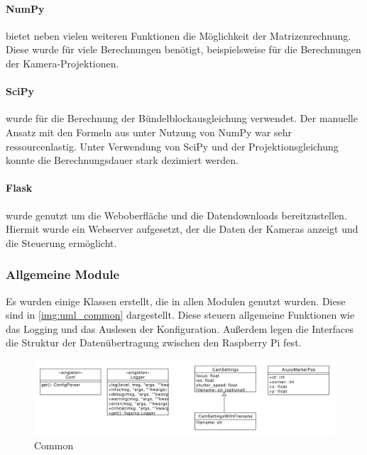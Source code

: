 \documentclass[./00PhotoBox.tex]{subfiles}
\begin{document}
\paragraph{NumPy}
bietet neben vielen weiteren Funktionen die Möglichkeit der Matrizenrechnung. Diese wurde für viele Berechnungen benötigt, beispielsweise für die Berechnungen der Kamera-Projektionen.

\paragraph{SciPy}
wurde für die Berechnung der Bündelblockausgleichung verwendet. Der manuelle Ansatz mit den Formeln aus \cite{luhmann} unter Nutzung von NumPy war sehr ressourcenlastig. Unter Verwendung von SciPy und der Projektionsgleichung konnte die Berechnungsdauer stark dezimiert werden.

\paragraph{Flask}
wurde genutzt um die Weboberfläche und die Datendownloads bereitzustellen. Hiermit wurde ein Webserver aufgesetzt, der die Daten der Kameras anzeigt und die Steuerung ermöglicht.

\subsubsection{Allgemeine Module}
Es wurden einige Klassen erstellt, die in allen Modulen genutzt wurden. Diese sind in \autoref{img:uml_common} dargestellt. Diese steuern allgemeine Funktionen wie das Logging und das Auslesen der Konfiguration. Außerdem legen die Interfaces die Struktur der Datenübertragung zwischen den Raspberry Pi fest. 

\begin{figure}
    \centering
    \includegraphics[width=1\textwidth]{./img/uml/uml_common_classdiagramm.pdf}
    \caption{Common} %
    \label{img:uml_common} %
\end{figure}
\end{document}

